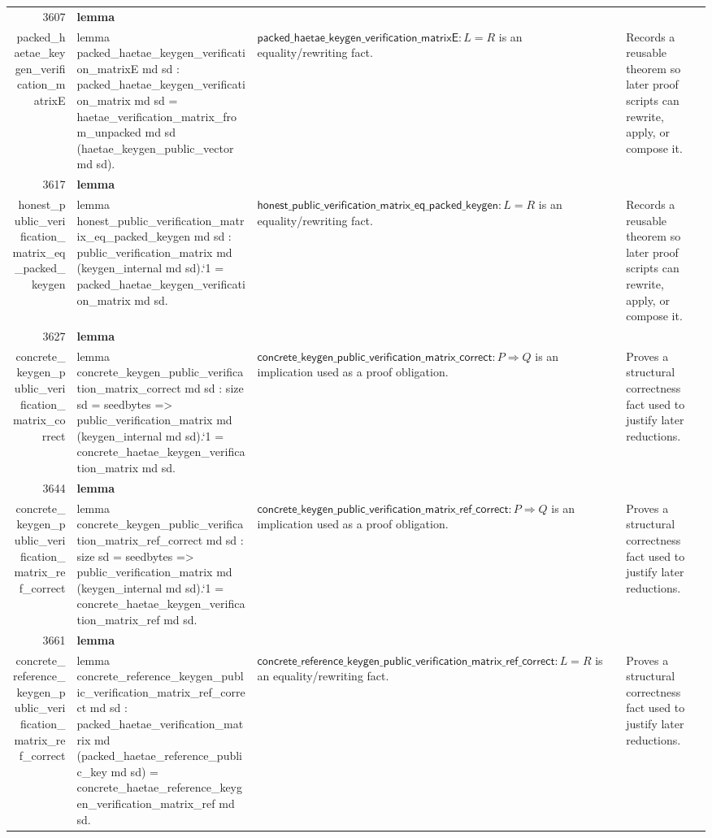\documentclass[10pt]{article}
\newcommand{\ec}[1]{\begingroup\ttfamily\scriptsize #1\endgroup}
\begin{document}
\begin{longtable}{r L{0.17\textwidth} L{0.26\textwidth} L{0.27\textwidth} L{0.20\textwidth}}
3607 & \textbf{lemma}\\\ec{packed\_haetae\_keygen\_verification\_matrixE} & \ec{lemma packed\_haetae\_keygen\_verification\_matrixE md sd : packed\_haetae\_keygen\_verification\_matrix md sd = haetae\_verification\_matrix\_from\_unpacked md sd (haetae\_keygen\_public\_vector md sd).} & \(\mathsf{packed\_haetae\_keygen\_verification\_matrixE} : L = R\) is an equality/rewriting fact. & Records a reusable theorem so later proof scripts can rewrite, apply, or compose it. \\
3617 & \textbf{lemma}\\\ec{honest\_public\_verification\_matrix\_eq\_packed\_keygen} & \ec{lemma honest\_public\_verification\_matrix\_eq\_packed\_keygen md sd : public\_verification\_matrix md (keygen\_internal md sd).`1 = packed\_haetae\_keygen\_verification\_matrix md sd.} & \(\mathsf{honest\_public\_verification\_matrix\_eq\_packed\_keygen} : L = R\) is an equality/rewriting fact. & Records a reusable theorem so later proof scripts can rewrite, apply, or compose it. \\
3627 & \textbf{lemma}\\\ec{concrete\_keygen\_public\_verification\_matrix\_correct} & \ec{lemma concrete\_keygen\_public\_verification\_matrix\_correct md sd : size sd = seedbytes => public\_verification\_matrix md (keygen\_internal md sd).`1 = concrete\_haetae\_keygen\_verification\_matrix md sd.} & \(\mathsf{concrete\_keygen\_public\_verification\_matrix\_correct} : P \Rightarrow Q\) is an implication used as a proof obligation. & Proves a structural correctness fact used to justify later reductions. \\
3644 & \textbf{lemma}\\\ec{concrete\_keygen\_public\_verification\_matrix\_ref\_correct} & \ec{lemma concrete\_keygen\_public\_verification\_matrix\_ref\_correct md sd : size sd = seedbytes => public\_verification\_matrix md (keygen\_internal md sd).`1 = concrete\_haetae\_keygen\_verification\_matrix\_ref md sd.} & \(\mathsf{concrete\_keygen\_public\_verification\_matrix\_ref\_correct} : P \Rightarrow Q\) is an implication used as a proof obligation. & Proves a structural correctness fact used to justify later reductions. \\
3661 & \textbf{lemma}\\\ec{concrete\_reference\_keygen\_public\_verification\_matrix\_ref\_correct} & \ec{lemma concrete\_reference\_keygen\_public\_verification\_matrix\_ref\_correct md sd : packed\_haetae\_verification\_matrix md (packed\_haetae\_reference\_public\_key md sd) = concrete\_haetae\_reference\_keygen\_verification\_matrix\_ref md sd.} & \(\mathsf{concrete\_reference\_keygen\_public\_verification\_matrix\_ref\_correct} : L = R\) is an equality/rewriting fact. & Proves a structural correctness fact used to justify later reductions. \\

\end{longtable}
\end{document}
